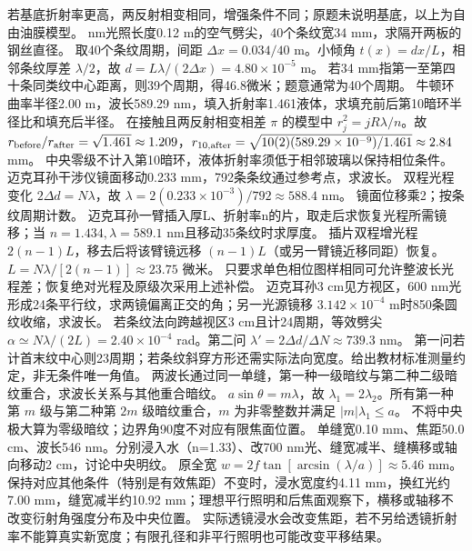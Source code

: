 \crosscheck 若基底折射率更高，两反射相变相同，增强条件不同；原题未说明基底，以上为自由油膜模型。
 nm光照长度0.12 m的空气劈尖，40个条纹宽34 mm，求隔开两板的钢丝直径。
\workings 取40个条纹周期，间距 $\Delta x=0.034/40$ m。小倾角 $t(x)=dx/L$，相邻条纹厚差 $\lambda/2$，故 $d=L\lambda/(2\Delta x)=4.80\times10^{-5}$ m。
\crosscheck 若34 mm指第一至第四十条同类纹中心距离，则39个周期，得46.8微米；题意通常为40个周期。
\problemtext 牛顿环曲率半径2.00 m，波长589.29 nm，填入折射率1.461液体，求填充前后第10暗环半径比和填充后半径。
\workings 在接触且两反射相变相差 $\pi$ 的模型中 $r_j^2=jR\lambda/n$。故 $r_{\rm before}/r_{\rm after}=\sqrt{1.461}\approx1.209$，$r_{10,\rm after}=\sqrt{10(2)(589.29\times10^{-9})/1.461}\approx2.84$ mm。
\crosscheck 中央零级不计入第10暗环，液体折射率须低于相邻玻璃以保持相位条件。
\problemtext 迈克耳孙干涉仪镜面移动0.233 mm，792条条纹通过参考点，求波长。
\workings 双程光程变化 $2\Delta d=N\lambda$，故 $\lambda=2(0.233\times10^{-3})/792\approx588.4$ nm。
\crosscheck 镜面位移乘2；按条纹周期计数。
\problemtext 迈克耳孙一臂插入厚L、折射率n的片，取走后求恢复光程所需镜移；当 $n=1.434,\lambda=589.1$ nm且移动35条纹时求厚度。
\workings 插片双程增光程 $2(n-1)L$，移去后将该臂镜远移 $(n-1)L$（或另一臂镜近移同距）恢复。$L=N\lambda/[2(n-1)]\approx23.75$ 微米。
\crosscheck 只要求单色相位图样相同可允许整波长光程差；恢复绝对光程及原级次采用上述补偿。
\problemtext 迈克耳孙3 cm见方视区，600 nm光形成24条平行纹，求两镜偏离正交的角；另一光源镜移 $3.142\times10^{-4}$ m时850条圆纹收缩，求波长。
\workings 若条纹法向跨越视区3 cm且计24周期，等效劈尖 $\alpha\simeq N\lambda/(2L)=2.40\times10^{-4}$ rad。第二问 $\lambda'=2\Delta d/\Delta N\approx739.3$ nm。
\crosscheck 第一问若计首末纹中心则23周期；若条纹斜穿方形还需实际法向宽度。给出教材标准测量约定，非无条件唯一角值。
\problemtext 两波长通过同一单缝，第一种一级暗纹与第二种二级暗纹重合，求波长关系与其他重合暗纹。
\workings $a\sin\theta=m\lambda$，故 $\lambda_1=2\lambda_2$。所有第一种第 $m$ 级与第二种第 $2m$ 级暗纹重合，$m$ 为非零整数并满足 $|m|\lambda_1\le a$。
\crosscheck 不将中央极大算为零级暗纹；边界角90度不对应有限焦面位置。
\problemtext 单缝宽0.10 mm、焦距50.0 cm、波长546 nm。分别浸入水（n=1.33）、改700 nm光、缝宽减半、缝横移或轴向移动2 cm，讨论中央明纹。
\workings 原全宽 $w=2f\tan[\arcsin(\lambda/a)]\approx5.46$ mm。保持对应其他条件（特别是有效焦距）不变时，浸水宽度约4.11 mm，换红光约7.00 mm，缝宽减半约10.92 mm；理想平行照明和后焦面观察下，横移或轴移不改变衍射角强度分布及中央位置。
\crosscheck 实际透镜浸水会改变焦距，若不另给透镜折射率不能算真实新宽度；有限孔径和非平行照明也可能改变平移结果。

